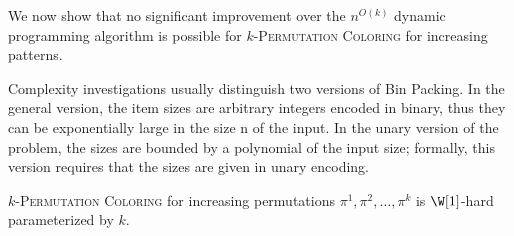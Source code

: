 We now show that no significant improvement over the $n^{O(k)}$ dynamic programming algorithm
is possible for \textsc{$k$-Permutation Coloring}
for increasing patterns.

Complexity investigations usually distinguish two versions of Bin Packing. In the general
version, the item sizes are arbitrary integers encoded in binary, thus they can be exponentially
large in the size n of the input. In the unary version of the problem, the sizes are bounded by
a polynomial of the input size; formally, this version requires that the sizes are given in unary
encoding.

\begin{proposition}
  \label{proposition:Monotonic Permutation Coloring}
  \textsc{$k$-Permutation Coloring} for increasing permutations
  $\pi^1, \pi^2, \dots, \pi^k$ is
  $\W[1]$-hard parameterized by $k$.
\end{proposition}

